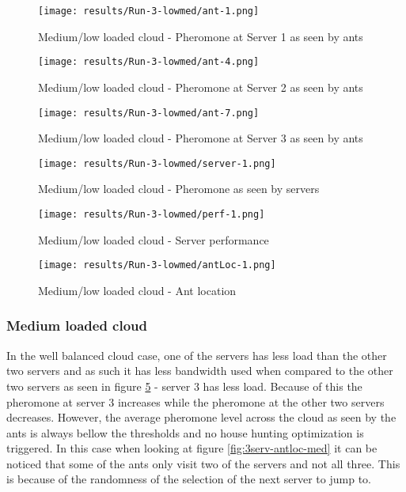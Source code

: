 \begin{figure}[!ht]
	\centering
		\texttt{[image: results/Run-3-lowmed/ant-1.png]}
	\caption{Medium/low loaded cloud - Pheromone at Server 1 as seen by ants}
	\label{fig:3serv-ant1-lowmed}
\end{figure}

\begin{figure}
	\centering
		\texttt{[image: results/Run-3-lowmed/ant-4.png]}
	\caption{Medium/low loaded cloud - Pheromone at Server 2 as seen by ants}
	\label{fig:3serv-ant4-lowmed}
\end{figure}

\begin{figure}
	\centering
		\texttt{[image: results/Run-3-lowmed/ant-7.png]}
	\caption{Medium/low loaded cloud - Pheromone at Server 3 as seen by ants}
	\label{fig:3serv-ant7-lowmed}
\end{figure}

\begin{figure}
	\centering
		\texttt{[image: results/Run-3-lowmed/server-1.png]}
	\caption{Medium/low loaded cloud - Pheromone as seen by servers}
	\label{fig:3serv-pher-lowmed}
\end{figure}

\begin{figure}
	\centering
		\texttt{[image: results/Run-3-lowmed/perf-1.png]}
	\caption{Medium/low loaded cloud - Server performance}
	\label{fig:3serv-perf-lowmed}
\end{figure}

\begin{figure}
	\centering
		\texttt{[image: results/Run-3-lowmed/antLoc-1.png]}
	\caption{Medium/low loaded cloud - Ant location}
	\label{fig:3serv-antloc-lowmed}
\end{figure}

\subsubsection{Medium loaded cloud}

In the well balanced cloud case, one of the servers has less load than the other two servers and as such it has less bandwidth used when compared to the other two servers as seen in figure \ref{fig:3serv-perf-lowmed} - server 3 has less load. Because of this the pheromone at server 3 increases while the pheromone at the other two servers decreases. However, the average pheromone level across the cloud as seen by the ants is always bellow the thresholds and no house hunting optimization is triggered. In this case when looking at figure \ref{fig:3serv-antloc-med} it can be noticed that some of the ants only visit two of the servers and not all three. This is because of the randomness of the selection of the next server to jump to.

